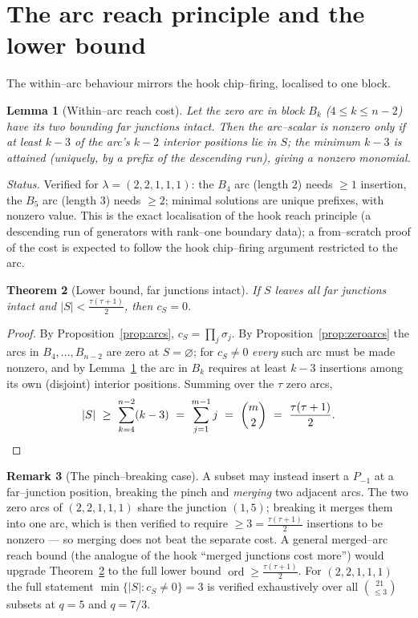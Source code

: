 \documentclass[11pt]{article}
\newtheorem{theorem}{Theorem}
\newtheorem{lemma}[theorem]{Lemma}
\theoremstyle{definition}
\newtheorem{remark}[theorem]{Remark}
\DeclareMathOperator{\ord}{ord}
\newcommand{\Pm}{P_{-1}}
\newcommand{\la}{\lambda}
\begin{document}
\section{The arc reach principle and the lower bound}

The within--arc behaviour mirrors the hook chip--firing, localised to one block.

\begin{lemma}[Within--arc reach cost]\label{lem:reach}
Let the zero arc in block $B_k$ ($4\le k\le n-2$) have its two bounding far junctions
intact. Then the arc--scalar is nonzero only if at least $k-3$ of the arc's $k-2$ interior
positions lie in $S$; the minimum $k-3$ is attained \textup(uniquely, by a prefix of the
descending run\textup), giving a nonzero monomial.
\end{lemma}

\noindent\emph{Status.} Verified for $\la=(2,2,1,1,1)$: the $B_4$ arc (length $2$) needs
$\ge1$ insertion, the $B_5$ arc (length $3$) needs $\ge2$; minimal solutions are unique
prefixes, with nonzero value. This is the exact localisation of the hook reach principle
(a descending run of generators with rank--one boundary data); a from--scratch proof
of the cost is expected to follow the hook chip--firing argument restricted to the arc.

\begin{theorem}[Lower bound, far junctions intact]\label{thm:lb-intact}
If $S$ leaves all far junctions intact and $|S|<\tfrac{\tau(\tau+1)}2$, then $c_S=0$.
\end{theorem}

\begin{proof}
By Proposition~\ref{prop:arcs}, $c_S=\prod_j\sigma_j$. By
Proposition~\ref{prop:zeroarcs} the arcs in $B_4,\dots,B_{n-2}$ are zero at
$S=\varnothing$; for $c_S\ne0$ \emph{every} such arc must be made nonzero, and by
Lemma~\ref{lem:reach} the arc in $B_k$ requires at least $k-3$ insertions among its own
(disjoint) interior positions. Summing over the $\tau$ zero arcs,
\[
|S|\ \ge\ \sum_{k=4}^{n-2}(k-3)\ =\ \sum_{j=1}^{m-1}j\ =\ \binom m2\ =\ \frac{\tau(\tau+1)}2 . \qedhere
\]
\end{proof}

\begin{remark}[The pinch--breaking case]
A subset may instead insert a $\Pm$ at a far--junction position, breaking the pinch and
\emph{merging} two adjacent arcs. The two zero arcs of $(2,2,1,1,1)$ share the junction
$(1,5)$; breaking it merges them into one arc, which is then verified to require
$\ge3=\tfrac{\tau(\tau+1)}2$ insertions to be nonzero --- so merging does not beat the
separate cost. A general merged--arc reach bound (the analogue of the hook ``merged
junctions cost more'') would upgrade Theorem~\ref{thm:lb-intact} to the full lower bound
$\ord\ge\tfrac{\tau(\tau+1)}2$. For $(2,2,1,1,1)$ the full statement
$\min\{|S|:c_S\ne0\}=3$ is verified exhaustively over all $\binom{21}{\le3}$ subsets at
$q=5$ and $q=7/3$.
\end{remark}
\end{document}
